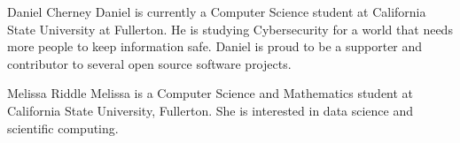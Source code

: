 \documentclass[11pt,journal,compsoc]{IEEEtran}
\begin{document}
\begin{IEEEbiographynophoto}{Daniel Cherney}
Daniel is currently a Computer Science student at California State University at Fullerton. He is studying Cybersecurity for a world that needs more people to keep information safe. Daniel is proud to be a supporter and contributor to several open source software projects. 
\end{IEEEbiographynophoto}

\begin{IEEEbiographynophoto}{Melissa Riddle}
Melissa is a Computer Science and Mathematics student at California State University, Fullerton. She is interested in data science and scientific computing. 
\end{IEEEbiographynophoto}
\end{document}
